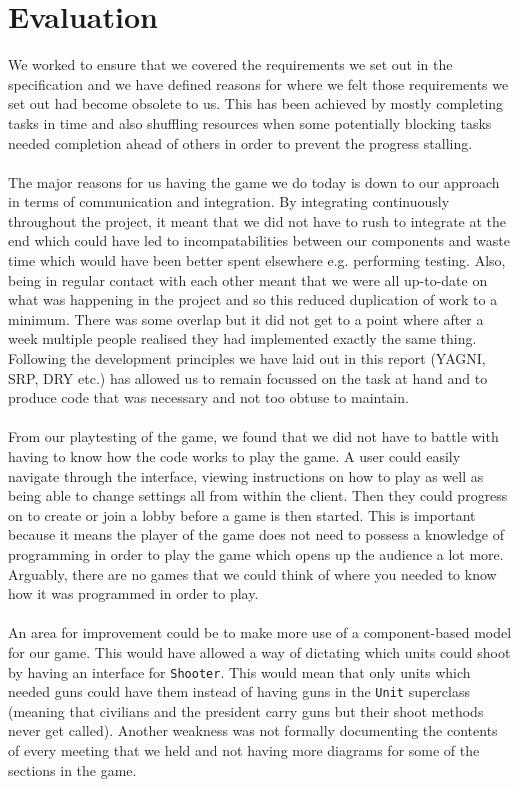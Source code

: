 \documentclass[12pt]{article}
\newcommand{\return}{\\\\\noindent}
\begin{document}
\section{Evaluation}
We worked to ensure that we covered the requirements we set out in the specification and we have defined reasons for where we felt those requirements we set out had become obsolete to us. This has been achieved by mostly completing tasks in time and also shuffling resources when some potentially blocking tasks needed completion ahead of others in order to prevent the progress stalling.\return
The major reasons for us having the game we do today is down to our approach in terms of communication and integration. By integrating continuously throughout the project, it meant that we did not have to rush to integrate at the end which could have led to incompatabilities between our components and waste time which would have been better spent elsewhere e.g. performing testing. Also, being in regular contact with each other meant that we were all up-to-date on what was happening in the project and so this reduced duplication of work to a minimum. There was some overlap but it did not get to a point where after a week multiple people realised they had implemented exactly the same thing. Following the development principles we have laid out in this report (YAGNI, SRP, DRY etc.) has allowed us to remain focussed on the task at hand and to produce code that was necessary and not too obtuse to maintain.\return
From our playtesting of the game, we found that we did not have to battle with having to know how the code works to play the game. A user could easily navigate through the interface, viewing instructions on how to play as well as being able to change settings all from within the client. Then they could progress on to create or join a lobby before a game is then started. This is important because it means the player of the game does not need to possess a knowledge of programming in order to play the game which opens up the audience a lot more. Arguably, there are no games that we could think of where you needed to know how it was programmed in order to play.\return
An area for improvement could be to make more use of a component-based model for our game. This would have allowed a way of dictating which units could shoot by having an interface for \texttt{Shooter}. This would mean that only units which needed guns could have them instead of having guns in the \texttt{Unit} superclass (meaning that civilians and the president carry guns but their shoot methods never get called). Another weakness was not formally documenting the contents of every meeting that we held and not having more diagrams for some of the sections in the game.\return
\end{document}
